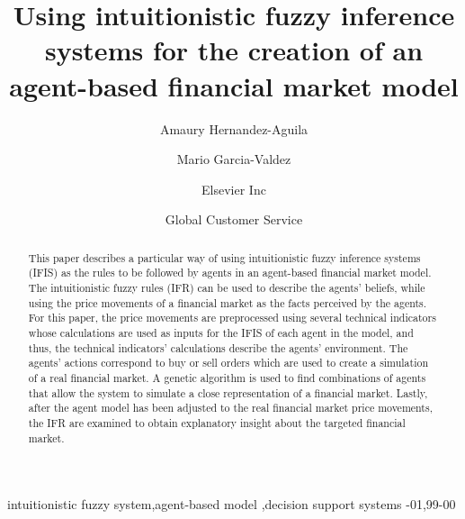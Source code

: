 \documentclass[review]{elsarticle}
\begin{document}
\begin{frontmatter}

\title{Using intuitionistic fuzzy inference systems for the creation of an agent-based financial market model}

\author{Amaury Hernandez-Aguila}
\address{Radarweg 29, Amsterdam}

\author{Mario Garcia-Valdez}
\address{Radarweg 29, Amsterdam}

\author[mymainaddress,mysecondaryaddress]{Elsevier Inc}

\author[mysecondaryaddress]{Global Customer Service}

\address[mymainaddress]{1600 John F Kennedy Boulevard, Philadelphia}
\address[mysecondaryaddress]{360 Park Avenue South, New York}

\begin{abstract}
This paper describes a particular way of using intuitionistic fuzzy inference
systems (IFIS) as the rules to be followed by agents in an agent-based financial
market model. %
The intuitionistic fuzzy rules (IFR)
can be used to describe the agents' beliefs, while using the price movements of
a financial market as the facts perceived by the agents. For this paper, the
price movements are preprocessed using several technical indicators whose
calculations are used as inputs for the IFIS of each agent in the model, and
thus, the technical indicators' calculations describe the agents'
environment. The agents' actions correspond to buy or sell orders which are used
to create a simulation of a real financial market. A genetic algorithm is used
to find combinations of agents that allow the system to simulate a close
representation of a financial market. Lastly, after the agent model has been
adjusted to the real financial market price movements, the IFR are examined to
obtain explanatory insight about the targeted financial market.
\end{abstract}

\begin{keyword}
intuitionistic fuzzy system\sep agent-based model \sep decision support systems
-01\sep  99-00
\end{keyword}

\end{frontmatter}
\end{document}
